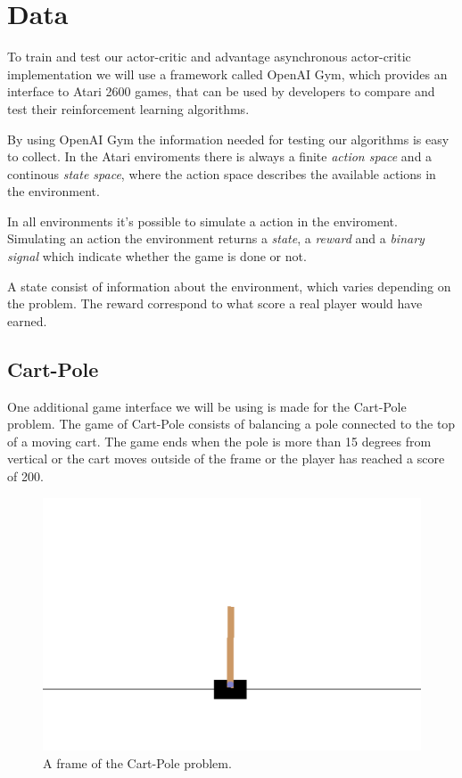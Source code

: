 \documentclass[11pt]{article}
\begin{document}
\maketitle

\section{Data}\label{Data}

To train and test our actor-critic and advantage asynchronous actor-critic implementation we will use a framework called OpenAI Gym, which provides an interface to Atari 2600 games, that can be used by developers to compare and test their reinforcement learning algorithms\cite{openAIGym}.

By using OpenAI Gym the information needed for testing our algorithms is easy to collect. 
In the Atari enviroments there is always a finite \textit{action space} and a continous \textit{state space}, where the action space describes the available actions in the environment.

In all environments it's possible to simulate a action in the enviroment. Simulating an action the environment returns a \textit{state}, a \textit{reward} and a \textit{binary signal} which indicate whether the game is done or not.

A state consist of information about the environment, which varies depending on the problem. The reward correspond to what score a real player would have earned.

\subsection{Cart-Pole}

One additional game interface we will be using is made for the Cart-Pole problem.
The game of Cart-Pole consists of balancing a pole connected to the top of a moving cart.
The game ends when the pole is more than 15 degrees from vertical or the cart moves outside of the frame or
the player has reached a score of 200.

\begin{figure}[!h]
    \centering
    \includegraphics[scale=0.5]{include/cartpole.png}
    \caption{A frame of the Cart-Pole problem.}
    \label{fig:cartpole}
\end{figure}
\end{document}

